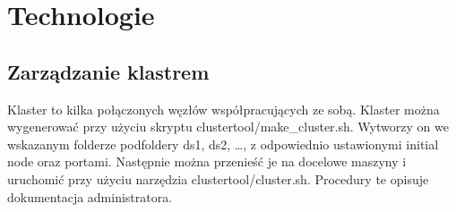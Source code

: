\section{Technologie}

\subsection{Zarządzanie klastrem}
Klaster to kilka połączonych węzłów współpracujących ze sobą. Klaster można wygenerować przy użyciu skryptu clustertool/make\_cluster.sh. Wytworzy on we wskazanym folderze podfoldery ds1, ds2, …, z odpowiednio ustawionymi initial node oraz portami. Następnie można przenieść je na docelowe maszyny i uruchomić przy użyciu narzędzia clustertool/cluster.sh.
Procedury te opisuje dokumentacja administratora.
